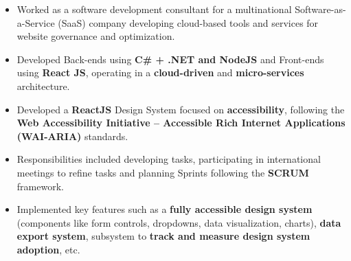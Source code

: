 \documentclass[10pt,a4paper,ragged2e]{altacv}
\begin{document}

\begin{fullwidth}
\makecvheader%
\end{fullwidth}



\begin{itemize}
	\item Worked as a software development consultant for a multinational Software-as-a-Service (SaaS) company developing cloud-based tools and services for website governance and optimization.
	\item Developed Back-ends using \textbf{C\# + .NET and NodeJS} and Front-ends using \textbf{React JS}, operating in a \textbf{cloud-driven} and \textbf{micro-services} architecture.
	\item Developed a \textbf{ReactJS} Design System focused on \textbf{accessibility}, following the \textbf{Web Accessibility Initiative – Accessible Rich Internet Applications (WAI-ARIA)} standards.
	\item Responsibilities included developing tasks, participating in international meetings to refine tasks and planning Sprints following the \textbf{SCRUM} framework.
	\item Implemented key features such as a \textbf{fully accessible design system} (components like form controls, dropdowns, data visualization, charts), \textbf{data export system}, subsystem to \textbf{track and measure design system adoption}, etc.
\end{itemize}
\end{document}
